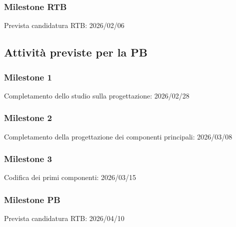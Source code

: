 \documentclass[a4paper,12pt]{article}
\begin{document}
\subsubsection*{Milestone RTB}
Prevista candidatura RTB: 2026/02/06 

\subsection{Attività previste per la PB}

\subsubsection*{Milestone 1}
Completamento dello studio sulla progettazione: 2026/02/28

\subsubsection{Milestone 2}
Completamento della progettazione dei componenti principali: 2026/03/08 

\subsubsection{Milestone 3}
Codifica dei primi componenti: 2026/03/15 

\subsubsection*{Milestone PB}
Prevista candidatura RTB: 2026/04/10 

\renewcommand{\arraystretch}{1.2}
\end{document}
